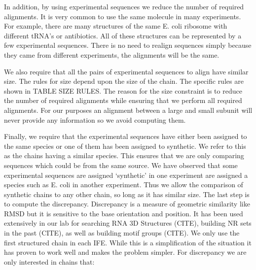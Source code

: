 In addition, by using experimental sequences we reduce the number of required
alignments. It is very common to use the same molecule in many experiments. For
example, there are many structures of the same E. coli ribosome with different
tRNA’s or antibiotics. All of these structures can be represented by a few
experimental sequences. There is no need to realign sequences simply because
they came from different experiments, the alignments will be the same.

We also require that all the pairs of experimental sequences to align  have
similar size. The rules for size depend upon the size of the chain. The specific
rules are shown in TABLE SIZE RULES. The reason for the size constraint is to
reduce the number of required alignments while ensuring that we perform all
required alignments. For our purposes an alignment between a large and small
subunit will never provide any information so we avoid computing them.

Finally, we require that the experimental sequences have either been assigned to
the same species or one of them has been assigned to synthetic. We refer to this
as the chains having a similar species. This ensures that we are only comparing
sequences which could be from the same source. We have observed that some
experimental sequences are assigned ‘synthetic’ in one experiment are assigned a
species such as E. coli in another experiment. Thus we allow the comparison of
synthetic chains to any other chain, so long as it has similar size. 
The last step is to compute the discrepancy. Discrepancy is a measure of
geometric similarity like RMSD but it is sensitive to the base orientation and
position. It has been used extensively in our lab for searching RNA 3D
Structures (CITE), building NR sets in the past (CITE), as well as building
motif groups (CITE). We only use the first structured chain in each IFE. While
this is a simplification of the situation it has proven to work well and makes
the problem simpler. For discrepancy we are only interested in chains that:

